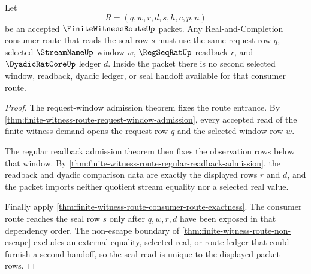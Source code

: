 \begin{theorem}
\label{thm:finite-witness-route-selected-window-seal-uniqueness}
Let
$$
R=(q,w,r,d,s,h,c,p,n)
$$
be an accepted $\FiniteWitnessRouteUp$ packet. Any Real-and-Completion consumer route that reads the seal row $s$ must use the same request row $q$, selected $\StreamNameUp$ window $w$, $\RegSeqRatUp$ readback $r$, and $\DyadicRatCoreUp$ ledger $d$. Inside the packet there is no second selected window, readback, dyadic ledger, or seal handoff available for that consumer route.
\end{theorem}
\begin{proof}
The request-window admission theorem fixes the route entrance. By \autoref{thm:finite-witness-route-request-window-admission}, every accepted read of the finite witness demand opens the request row $q$ and the selected window row $w$.

The regular readback admission theorem then fixes the observation rows below that window. By \autoref{thm:finite-witness-route-regular-readback-admission}, the readback and dyadic comparison data are exactly the displayed rows $r$ and $d$, and the packet imports neither quotient stream equality nor a selected real value.

Finally apply \autoref{thm:finite-witness-route-consumer-route-exactness}. The consumer route reaches the seal row $s$ only after $q,w,r,d$ have been exposed in that dependency order. The non-escape boundary of \autoref{thm:finite-witness-route-non-escape} excludes an external equality, selected real, or route ledger that could furnish a second handoff, so the seal read is unique to the displayed packet rows.
\end{proof}

